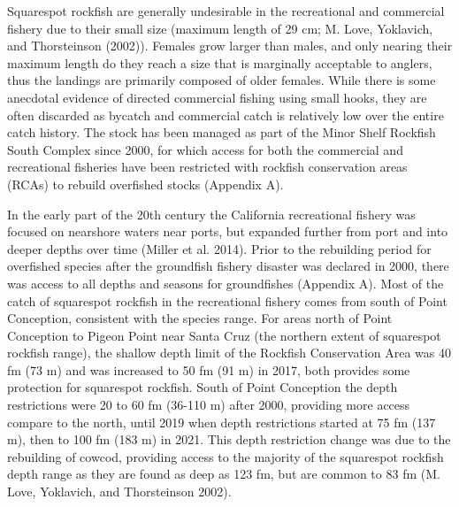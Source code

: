 \documentclass[11pt,
  english,
  a4paper,
]{article}
\begin{document}
\leavevmode\tagmcend\tagstructend


Squarespot rockfish are generally undesirable in the recreational and commercial fishery due to their small size (maximum length of 29 cm; {M. Love, Yoklavich, and Thorsteinson (2002)\leavevmode\tagmcend\tagstructend}). Females grow larger than males, and only nearing their maximum length do they reach a size that is marginally acceptable to anglers, thus the landings are primarily composed of older females. While there is some anecdotal evidence of directed commercial fishing using small hooks, they are often discarded as bycatch and commercial catch is relatively low over the entire catch history. The stock has been managed as part of the Minor Shelf Rockfish South Complex since 2000, for which access for both the commercial and recreational fisheries have been restricted with rockfish conservation areas (RCAs) to rebuild overfished stocks (Appendix A).

\leavevmode\tagmcend\tagstructend\par


In the early part of the 20th century the California recreational fishery was focused on nearshore waters near ports, but expanded further from port and into deeper depths over time {(Miller et al. 2014)\leavevmode\tagmcend\tagstructend}. Prior to the rebuilding period for overfished species after the groundfish fishery disaster was declared in 2000, there was access to all depths and seasons for groundfishes (Appendix A). Most of the catch of squarespot rockfish in the recreational fishery comes from south of Point Conception, consistent with the species range. For areas north of Point Conception to Pigeon Point near Santa Cruz (the northern extent of squarespot rockfish range), the shallow depth limit of the Rockfish Conservation Area was 40 fm (73 m) and was increased to 50 fm (91 m) in 2017, both provides some protection for squarespot rockfish. South of Point Conception the depth restrictions were 20 to 60 fm (36-110 m) after 2000, providing more access compare to the north, until 2019 when depth restrictions started at 75 fm (137 m), then to 100 fm (183 m) in 2021. This depth restriction change was due to the rebuilding of cowcod, providing access to the majority of the squarespot rockfish depth range as they are found as deep as 123 fm, but are common to 83 fm {(M. Love, Yoklavich, and Thorsteinson 2002)\leavevmode\tagmcend\tagstructend}.
\end{document}
